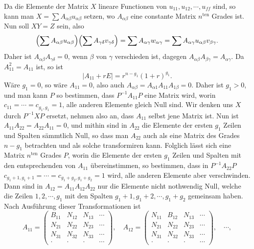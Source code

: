\documentclass[11pt]{article}
\newcommand{\ten}{\mathrm{ten}}
\begin{document}
Da die Elemente der Matrix $X$ lineare Functionen von $u_{11},u_{12},\cdots,u_{ff}$ sind, so kann man $X=\sum A_{\alpha\beta}u_{\alpha\beta}$ setzen, wo $A_{\alpha\beta}$ eine constante Matrix $n^{\ten}$ Grades ist. Nun soll $XY=Z$ sein, also
\[
\Bigl(\sum A_{\alpha\beta}u_{\alpha\beta}\Bigr)
\Bigl(\sum A_{\gamma\delta}v_{\gamma\delta}\Bigr)
 =\sum A_{\alpha\gamma}w_{\alpha\gamma}
 =\sum A_{\alpha\gamma}u_{\alpha\beta}v_{\beta\gamma}.
\]
Daher ist $A_{\alpha\beta}A_{\gamma\delta}=0$, wenn $\beta$ von $\gamma$ verschieden ist, dagegen $A_{\alpha\beta}A_{\beta\gamma}=A_{\alpha\gamma}$. Da $A_{11}^2=A_{11}$ ist, so ist
\[
|A_{11}+rE|=r^{n-g_1}(1+r)^{g_1}.
\]
Wäre $g_1=0$, so wäre $A_{11}=0$, also auch $A_{\alpha\beta}=A_{\alpha1}A_{11}A_{1\beta}=0$. Daher ist $g_1>0$, und man kann $P$ so bestimmen, dass $P^{-1}A_{11}P$ eine Matrix wird, worin $c_{11}=\cdots=c_{g_1,g_1}=1$, alle anderen Elemente gleich Null sind. Wir denken uns $X$ durch $P^{-1}XP$ ersetzt, nehmen also an, dass $A_{11}$ selbst jene Matrix ist. Nun ist $A_{11}A_{22}=A_{22}A_{11}=0$, und mithin sind in $A_{22}$ die Elemente der ersten $g_1$ Zeilen und Spalten sämmtlich Null, so dass man $A_{22}$ auch als eine Matrix des Grades $n-g_1$ betrachten und als solche transformiren kann. Folglich lässt sich eine Matrix $n^{\ten}$ Grades $P$, worin die Elemente der ersten $g_1$ Zeilen und Spalten mit den entsprechenden von $A_{11}$ übereinstimmen, so bestimmen, dass in $P^{-1}A_{22}P$ $c_{g_1+1,g_1+1}=\cdots=c_{g_1+g_2,g_1+g_2}=1$ wird, alle anderen Elemente aber verschwinden. Dann sind in $A_{12}=A_{11}A_{12}A_{22}$ nur die Elemente nicht nothwendig Null, welche die Zeilen $1,2,\cdots,g_1$ mit den Spalten $g_1+1,g_1+2,\cdots,g_1+g_2$ gemeinsam haben. Nach Ausführung dieser Transformationen ist
\[
A_{11}=\begin{pmatrix}
B_{11}&N_{12}&N_{13}&\cdots\\
N_{21}&N_{22}&N_{23}&\cdots\\
N_{31}&N_{32}&N_{33}&\cdots\\
\cdot&\cdot&\cdot&\cdots
\end{pmatrix},\quad
A_{12}=\begin{pmatrix}
N_{11}&B_{12}&N_{13}&\cdots\\
N_{21}&N_{22}&N_{23}&\cdots\\
N_{31}&N_{32}&N_{33}&\cdots\\
\cdot&\cdot&\cdot&\cdots
\end{pmatrix},\quad\cdots,
\]
\end{document}
